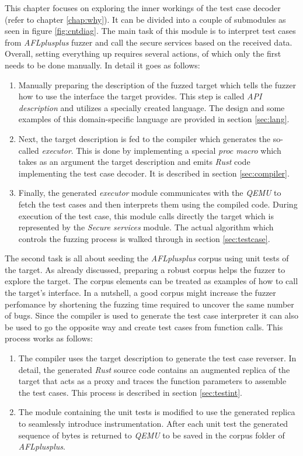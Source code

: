 This chapter focuses on exploring the inner workings of the test case decoder (refer to chapter \ref{chap:why}). It can be divided into a couple of submodules as seen in figure \ref{fig:cntdiag}. The main task of this module is to interpret test cases from \textit{AFLplusplus} fuzzer and call the secure services based on the received data. Overall, setting everything up requires several actions, of which only the first needs to be done manually. In detail it goes as follows:
\begin{enumerate}
    \item Manually preparing the description of the fuzzed target which tells the fuzzer how to use the interface the target provides. This step is called \textit{API description} and utilizes a specially created language. The design and some examples of this domain-specific language are provided in section \ref{sec:lang}.
    \item Next, the target description is fed to the compiler which generates the so-called \textit{executor}. This is done by implementing a special \textit{proc macro} which takes as an argument the target description and emits \textit{Rust} code implementing the test case decoder. It is described in section \ref{sec:compiler}.
    \item Finally, the generated \textit{executor} module communicates with the \textit{QEMU} to fetch the test cases and then interprets them using the compiled code. During execution of the test case, this module calls directly the target which is represented by the \textit{Secure services} module. The actual algorithm which controls the fuzzing process is walked through in section \ref{sec:testcase}.
\end{enumerate}
The second task is all about seeding the \textit{AFLplusplus} corpus using unit tests of the target. As already discussed, preparing a robust corpus helps the fuzzer to explore the target. The corpus elements can be treated as examples of how to call the target's interface. In a nutshell, a good corpus might increase the fuzzer perfomance by shortening the fuzzing time required to uncover the same number of bugs. Since the compiler is used to generate the test case interpreter it can also be used to go the opposite way and create test cases from function calls. This process works as follows:
\begin{enumerate}
    \item The compiler uses the target description to generate the test case reverser. In detail, the generated \textit{Rust} source code contains an augmented replica of the target that acts as a proxy and traces the function parameters to assemble the test cases. This process is described in section \ref{sec:testint}.
    \item The module containing the unit tests is modified to use the generated replica to seamlessly introduce instrumentation. After each unit test the generated sequence of bytes is returned to \textit{QEMU} to be saved in the corpus folder of \textit{AFLplusplus}.
\end{enumerate}
